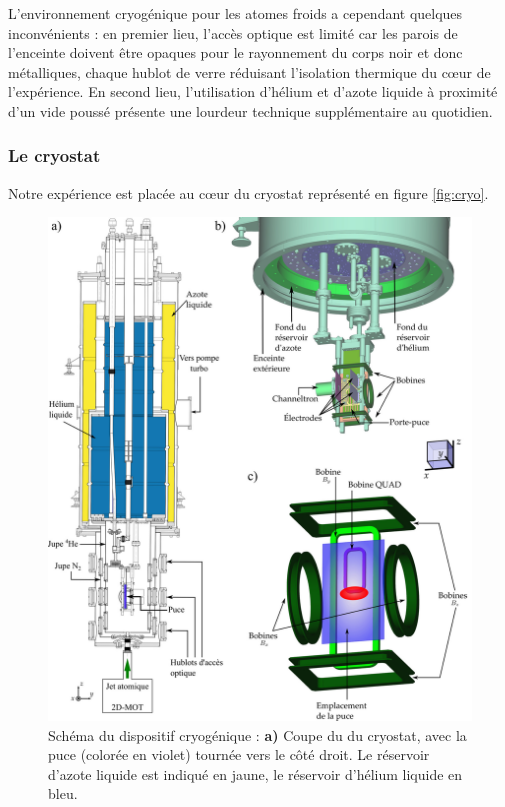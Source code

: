 L'environnement cryogénique pour les atomes froids a cependant quelques inconvénients :
en premier lieu, l'accès optique est limité car les parois de l'enceinte doivent être opaques pour le rayonnement du corps noir et donc métalliques, chaque hublot de verre réduisant l'isolation thermique du c\oe ur de l'expérience.
En second lieu, l'utilisation d'hélium et d'azote liquide à proximité d'un vide poussé présente une lourdeur technique supplémentaire au quotidien.

	\subsubsection*{Le cryostat}
\noindent Notre expérience est placée au c\oe ur du cryostat représenté en figure \eqref{fig:cryo}.
%
\begin{figure}
\centering
\includegraphics[width=\linewidth]{figures/setup/coldatoms/cryo_vect2.jpg}
\caption[Schéma du cryostat]{Schéma du dispositif cryogénique :
\textbf{a)} Coupe du du cryostat, avec la puce (colorée en violet) tournée vers le côté droit.
Le réservoir d'azote liquide est indiqué en jaune, le réservoir d'hélium liquide en bleu.
}
\end{figure}
